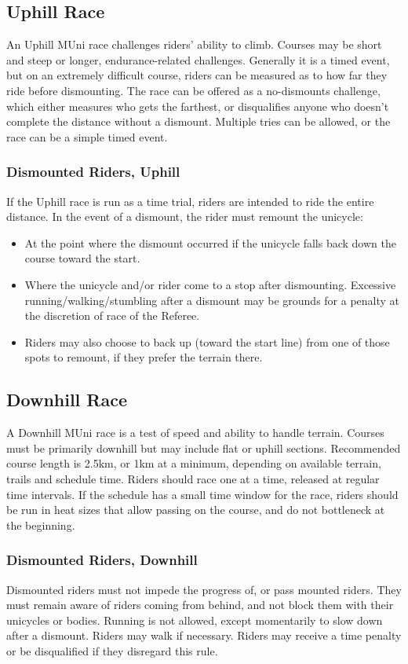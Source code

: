 \subsection{Uphill Race}
An Uphill MUni race challenges riders' ability to climb.
Courses may be short and steep or longer, endurance-related challenges.
Generally it is a timed event, but on an extremely difficult course, riders can be measured as to how far they ride before dismounting.
The race can be offered as a no-dismounts challenge, which either measures who gets the farthest, or disqualifies anyone who doesn't complete the distance without a dismount.
Multiple tries can be allowed, or the race can be a simple timed event.

\subsubsection{Dismounted Riders, Uphill}
If the Uphill race is run as a time trial, riders are intended to ride the entire distance.
In the event of a dismount, the rider must remount the unicycle:
\begin{itemize}
\item At the point where the dismount occurred if the unicycle falls back down the course toward the start.
\item Where the unicycle and/or rider come to a stop after dismounting.
Excessive running/walking/stumbling after a dismount may be grounds for a penalty at the discretion of race of the Referee.
\item Riders may also choose to back up (toward the start line) from one of those spots to remount, if they prefer the terrain there.
\end{itemize}

\subsection{Downhill Race}
A Downhill MUni race is a test of speed and ability to handle terrain.
Courses must be primarily downhill but may include flat or uphill sections.
Recommended course length is 2.5km, or 1km at a minimum, depending on available terrain, trails and schedule time.
Riders should race one at a time, released at regular time intervals.
If the schedule has a small time window for the race, riders should be run in heat sizes that allow passing on the course, and do not bottleneck at the beginning.

\subsubsection{Dismounted Riders, Downhill}
Dismounted riders must not impede the progress of, or pass mounted riders.
They must remain aware of riders coming from behind, and not block them with their unicycles or bodies.
Running is not allowed, except momentarily to slow down after a dismount.
Riders may walk if necessary.
Riders may receive a time penalty or be disqualified if they disregard this rule.

